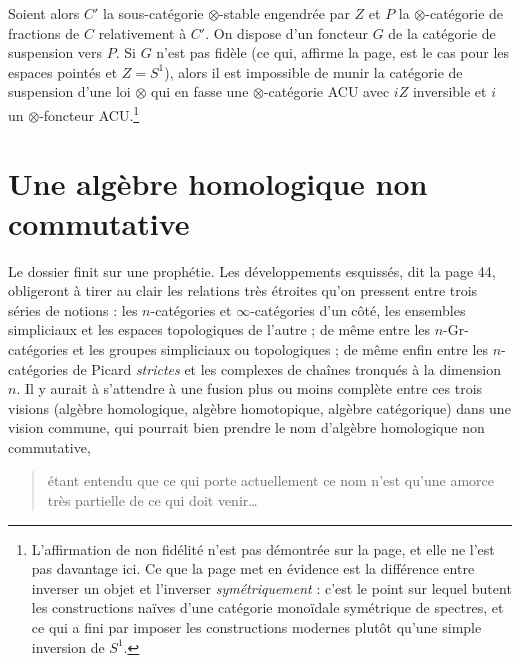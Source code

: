 \documentclass[11pt,a4paper]{article}
\begin{document}
Soient alors $C'$ la sous-catégorie $\otimes$-stable engendrée par $Z$ et $P$
la $\otimes$-catégorie de fractions de $C$ relativement à $C'$. On dispose
d'un foncteur $G$ de la catégorie de suspension vers $P$. Si $G$ n'est pas fidèle (ce qui, affirme la page, est le cas pour les
espaces pointés et $Z = S^{1}$), alors il est impossible de munir la catégorie de suspension
d'une loi $\otimes$ qui en fasse une $\otimes$-catégorie ACU avec $iZ$
inversible et $i$ un $\otimes$-foncteur ACU.\footnote{L'affirmation de non
fidélité n'est pas démontrée sur la page, et elle ne l'est pas davantage ici.
Ce que la page met en évidence est la différence entre inverser un objet et
l'inverser \emph{symétriquement} : c'est le point sur lequel butent les
constructions naïves d'une catégorie monoïdale symétrique de spectres, et ce
qui a fini par imposer les constructions modernes plutôt qu'une simple
inversion de $S^{1}$.}

\section*{Une algèbre homologique non commutative}

Le dossier finit sur une prophétie. Les
développements esquissés, dit la page 44, obligeront à tirer au clair les
relations très étroites qu'on pressent entre trois séries de notions : les
$n$-catégories et $\infty$-catégories d'un côté, les ensembles simpliciaux et
les espaces topologiques de l'autre ; de même entre les $n$-Gr-catégories et
les groupes simpliciaux ou topologiques ; de même enfin entre les
$n$-catégories de Picard \emph{strictes} et les complexes de chaînes tronqués
à la dimension $n$. Il y aurait à s'attendre à une fusion plus ou moins
complète entre ces trois visions (algèbre homologique, algèbre homotopique,
algèbre catégorique) dans une vision commune, qui pourrait bien prendre le
nom d'algèbre homologique non commutative,

\begin{quote}
étant entendu que ce qui porte actuellement ce nom n'est qu'une amorce très
partielle de ce qui doit venir\ldots
\end{quote}
\end{document}
